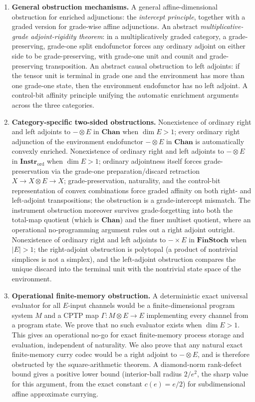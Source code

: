 \documentclass[11pt]{article}
\begin{document}
\begin{enumerate}[label=\arabic*., leftmargin=*]

\item \textbf{General obstruction mechanisms.}
A general affine-dimensional obstruction for enriched adjunctions: the
\emph{intercept principle}, together with a graded version for grade-wise
affine adjunctions. An abstract \emph{multiplicative-grade adjoint-rigidity
theorem}: in a multiplicatively graded category, a grade-preserving,
grade-one split endofunctor forces any ordinary adjoint on either side to be
grade-preserving, with grade-one unit and counit and grade-preserving
transposition. An abstract causal obstruction to left adjoints: if the tensor
unit is terminal in grade one and the environment has more than one grade-one
state, then the environment endofunctor has no left adjoint. A control-bit
affinity principle unifying the automatic enrichment arguments across the
three categories.

\item \textbf{Category-specific two-sided obstructions.}
Nonexistence of ordinary right and left adjoints to $-\otimes E$ in
$\mathbf{Chan}$ when $\dim E>1$; every ordinary right adjunction of the
environment endofunctor $-\otimes E$ in $\mathbf{Chan}$ is automatically
convexly enriched. Nonexistence of ordinary right and left
adjoints to $-\otimes E$ in $\mathbf{Instr}_{\mathrm{ord}}$ when
$\dim E>1$; ordinary adjointness itself forces grade-preservation via the
grade-one preparation/discard retraction $X\to X\otimes E\to X$;
grade-preservation, naturality, and the control-bit representation of convex
combinations force graded affinity on both right- and left-adjoint
transpositions; the obstruction is a grade-intercept mismatch. The instrument
obstruction moreover survives grade-forgetting into both the total-map quotient
(which is $\mathbf{Chan}$) and the finer multiset quotient, where an operational
no-programming argument rules out a right adjoint outright. Nonexistence of
ordinary right and left adjoints to $-\times E$ in $\mathbf{FinStoch}$ when
$|E|>1$; the right-adjoint obstruction is polytopal (a product of nontrivial
simplices is not a simplex), and the left-adjoint obstruction compares the
unique discard into the terminal unit with the nontrivial state space of the
environment.

\item \textbf{Operational finite-memory obstruction.}
A deterministic exact universal evaluator for all $E$-input channels would be
a finite-dimensional program system $M$ and a CPTP map
$\Gamma:M\otimes E\to E$ implementing every channel from a program state. We
prove that no such evaluator exists when $\dim E>1$. This gives an
operational no-go for exact finite-memory process storage and evaluation,
independent of naturality. We also prove that any natural exact finite-memory
curry codec would be a right adjoint to $-\otimes E$, and is therefore
obstructed by the square-arithmetic theorem. A diamond-norm rank-defect bound
gives a positive lower bound (interior-ball radius $2/e^2$, the sharp value for
this argument, from the exact constant $c(e)=e/2$) for subdimensional affine
approximate currying.


\end{enumerate}
\end{document}
